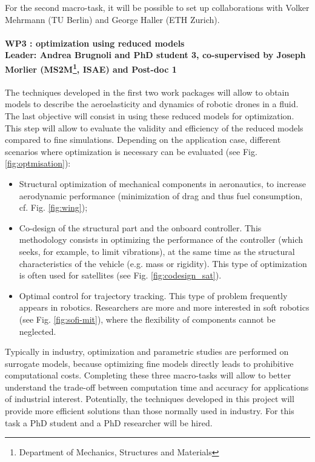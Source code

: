\documentclass[12pt]{article}
\begin{document}
		For the second macro-task, it will be possible to set up collaborations with Volker Mehrmann (TU Berlin) and George Haller (ETH Zurich).
		
	
	\paragraph[\large WP3 : optimization using reduced models\\
	Leader: Andrea Brugnoli and PhD student 3, co-supervised by Joseph Morlier (MS2M, ISAE) and Post-doc 1\\]{\large WP3 : optimization using reduced models\\
		Leader: Andrea Brugnoli and PhD student 3, co-supervised by Joseph Morlier (MS2M\footnote{Department of Mechanics, Structures and Materials}, ISAE) and Post-doc 1\\}
	
	The techniques developed in the first two work packages will allow to obtain models to describe the aeroelasticity and dynamics of robotic drones in a fluid.
	The last objective will consist in using these reduced models for optimization. This step will allow to evaluate the validity and efficiency of the reduced models compared to fine simulations. Depending on the application case, different scenarios where optimization is necessary can be evaluated (see Fig. \ref{fig:optmisation}): 
	\begin{itemize}
		\item Structural optimization of mechanical components in aeronautics, to increase aerodynamic performance (minimization of drag and thus fuel consumption, cf. Fig. \ref{fig:wing}); 
		\item Co-design of the structural part and the onboard controller. This methodology consists in optimizing the performance of the controller (which seeks, for example, to limit vibrations), at the same time as the structural characteristics of the vehicle (e.g. mass or rigidity). This type of optimization is often used for satellites (see Fig. \ref{fig:codesign_sat}).
		\item Optimal control for trajectory tracking. This type of problem frequently appears in robotics. Researchers are more and more interested in soft robotics (see Fig. \ref{fig:sofi-mit}), where the flexibility of components cannot be neglected.
	\end{itemize}
	
	Typically in industry, optimization and parametric studies are performed on surrogate models, because optimizing fine models directly leads to prohibitive computational costs. Completing these three macro-tasks will allow to better understand the trade-off between computation time and accuracy for
	applications of industrial interest. Potentially, the techniques developed in this project will provide more efficient solutions than those normally used in industry. For this task a PhD student and a PhD researcher will be hired. 
	
\end{document}
